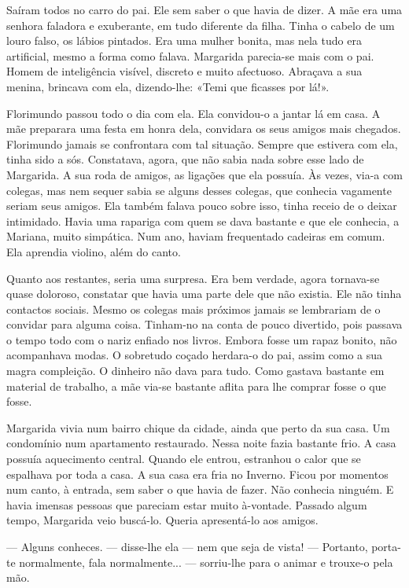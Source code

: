 Saíram todos no carro do pai. Ele sem saber o que havia de dizer. A mãe
era uma senhora faladora e exuberante, em tudo diferente da filha. Tinha
o cabelo de um louro falso, os lábios pintados. Era uma mulher bonita,
mas nela tudo era artificial, mesmo a forma como falava. Margarida
parecia-se mais com o pai. Homem de inteligência visível, discreto e
muito afectuoso. Abraçava a sua menina, brincava com ela, dizendo-lhe:
«Temi que ficasses por lá!».

Florimundo passou todo o dia com ela. Ela convidou-o a jantar lá em
casa. A mãe preparara uma festa em honra dela, convidara os seus amigos
mais chegados. Florimundo jamais se confrontara com tal situação. Sempre
que estivera com ela, tinha sido a sós. Constatava, agora, que não sabia
nada sobre esse lado de Margarida. A sua roda de amigos, as ligações que
ela possuía. Às vezes, via-a com colegas, mas nem sequer sabia se alguns
desses colegas, que conhecia vagamente seriam seus amigos. Ela também
falava pouco sobre isso, tinha receio de o deixar intimidado. Havia uma
rapariga com quem se dava bastante e que ele conhecia, a Mariana, muito
simpática. Num ano, haviam frequentado cadeiras em comum. Ela aprendia
violino, além do canto.

Quanto aos restantes, seria uma surpresa. Era bem verdade, agora
tornava-se quase doloroso, constatar que havia uma parte dele que não
existia. Ele não tinha contactos sociais. Mesmo os colegas mais próximos
jamais se lembrariam de o convidar para alguma coisa. Tinham-no na conta
de pouco divertido, pois passava o tempo todo com o nariz enfiado nos
livros. Embora fosse um rapaz bonito, não acompanhava modas. O sobretudo
coçado herdara-o do pai, assim como a sua magra compleição. O dinheiro
não dava para tudo. Como gastava bastante em material de trabalho, a mãe
via-se bastante aflita para lhe comprar fosse o que fosse.

Margarida vivia num bairro chique da cidade, ainda que perto da sua
casa. Um condomínio num apartamento restaurado. Nessa noite fazia
bastante frio. A casa possuía aquecimento central. Quando ele entrou,
estranhou o calor que se espalhava por toda a casa. A sua casa era fria
no Inverno. Ficou por momentos num canto, à entrada, sem saber o que
havia de fazer. Não conhecia ninguém. E havia imensas pessoas que
pareciam estar muito à-vontade. Passado algum tempo, Margarida veio
buscá-lo. Queria apresentá-lo aos amigos.

--- Alguns conheces. --- disse-lhe ela --- nem que seja de vista! --- Portanto,
porta-te normalmente, fala normalmente... --- sorriu-lhe para o animar e
trouxe-o pela mão.

